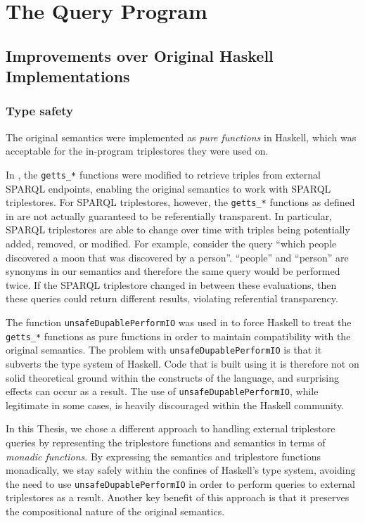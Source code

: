 \documentclass[../main.tex]{subfiles}
\begin{document}
\chapter{The Query Program}

\label{chapter:implementation}

\section{Improvements over Original Haskell Implementations}

\subsection{Type safety}

The original semantics were implemented as {\em pure functions} in Haskell, which was acceptable for the in-program triplestores they were used on.

In \cite{agboola2015extensible}, the \texttt{getts\_*} functions were modified to retrieve triples from external SPARQL endpoints, enabling the original
semantics to work with SPARQL triplestores.  For SPARQL triplestores, however, the \texttt{getts\_*} functions as defined in \cite{agboola2015extensible} are not actually guaranteed to be referentially transparent. In particular, SPARQL triplestores are able to change over time with triples being potentially added, removed, or modified.
For example, consider the query ``which people discovered a moon that was discovered by a person''.
``people'' and ``person'' are synonyms in our semantics and therefore the same query would be performed twice.  If the SPARQL triplestore changed in between these evaluations,
then these queries could return different results, violating referential transparency.

The function \texttt{unsafeDupablePerformIO} was used in \cite{agboola2015extensible} to force Haskell to treat the \texttt{getts\_*} functions as pure functions
in order to maintain compatibility with the original semantics. The problem with \texttt{unsafeDupablePerformIO} is that it subverts the type system of Haskell.  Code that is built using it is therefore not on
solid theoretical ground within the constructs of the language, and surprising effects can occur as a result.  The use of \texttt{unsafeDupablePerformIO}, while
legitimate in some cases, is heavily discouraged within the Haskell community\cite{noUnsafePerformIO}.

In this Thesis, we chose a different approach to handling external triplestore queries by representing the triplestore functions and semantics in terms of {\em monadic functions}.
By expressing the semantics and triplestore functions monadically, we stay safely within the confines of Haskell's type system, avoiding
the need to use \texttt{unsafeDupablePerformIO} in order to perform queries to external triplestores as a result.  Another key benefit of this approach is that it preserves the compositional nature of the original semantics.
\end{document}
